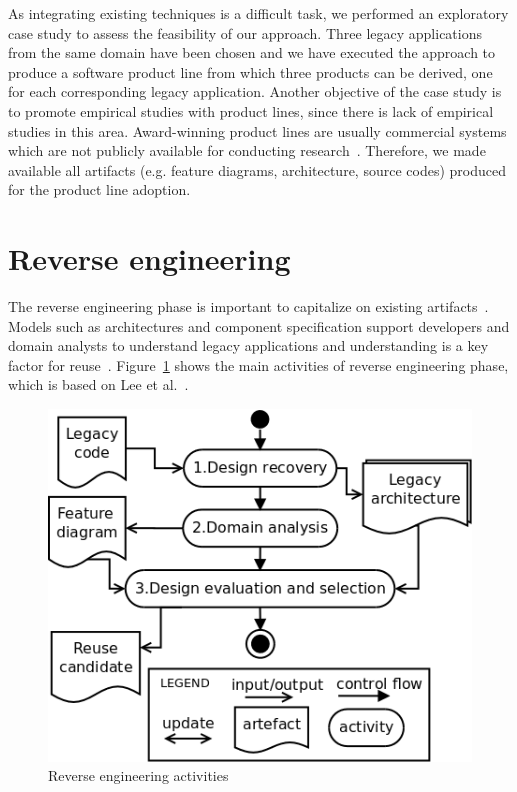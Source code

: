 \documentclass[11pt,twoside]{article}
\begin{document}
As integrating existing techniques is a difficult task, we performed an exploratory case study to assess the feasibility of our approach. Three legacy
applications from the
same domain have been chosen and we have executed the approach to produce a software product line from which three products can be derived, one for
each corresponding legacy
application. Another objective of the case study is to promote empirical studies with product lines, since there is lack of empirical studies in this
area. Award-winning product
lines are usually commercial systems which are not publicly available for conducting research~\cite{Couto:2011:SMR}. Therefore, we made available all
artifacts (e.g. feature
diagrams, architecture, source codes) produced for the product line adoption.

\section{Reverse engineering}
The reverse engineering phase is important to capitalize on existing artifacts~\cite{Lee:2009:ERU}. Models such as architectures and
component specification support developers and domain analysts to understand legacy applications and understanding is a key factor
for reuse~\cite{Frakes:1996:SRM}. Figure~\ref{fig:reverseEngineering} shows the main activities of reverse engineering phase, which is based
on Lee et al.~\cite{Lee:2009:ERU}. 

\begin{figure}[!htb]
   \centering
   \includegraphics[scale=0.4]{figs/reverseEngineering-v01.png}
   \caption{Reverse engineering activities}
   \label{fig:reverseEngineering}
\end{figure}
\end{document}
